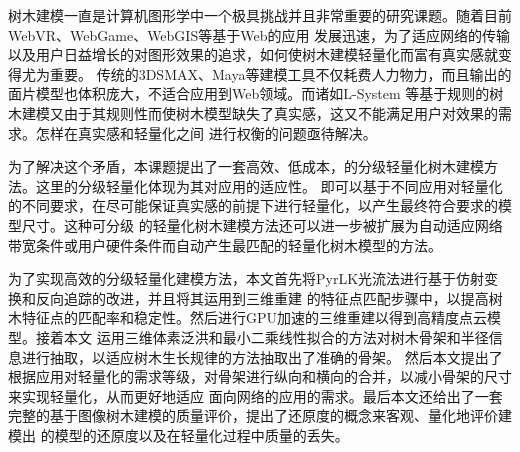 \begin{cabstract}
树木建模一直是计算机图形学中一个极具挑战并且非常重要的研究课题。随着目前WebVR、WebGame、WebGIS等基于Web的应用
发展迅速，为了适应网络的传输以及用户日益增长的对图形效果的追求，如何使树木建模轻量化而富有真实感就变得尤为重要。
传统的3DSMAX、Maya等建模工具不仅耗费人力物力，而且输出的面片模型也体积庞大，不适合应用到Web领域。而诸如L-System
等基于规则的树木建模又由于其规则性而使树木模型缺失了真实感，这又不能满足用户对效果的需求。怎样在真实感和轻量化之间
进行权衡的问题亟待解决。

为了解决这个矛盾，本课题提出了一套高效、低成本，的分级轻量化树木建模方法。这里的分级轻量化体现为其对应用的适应性。
即可以基于不同应用对轻量化的不同要求，在尽可能保证真实感的前提下进行轻量化，以产生最终符合要求的模型尺寸。这种可分级
的轻量化树木建模方法还可以进一步被扩展为自动适应网络带宽条件或用户硬件条件而自动产生最匹配的轻量化树木模型的方法。

为了实现高效的分级轻量化建模方法，本文首先将PyrLK光流法进行基于仿射变换和反向追踪的改进，并且将其运用到三维重建
的特征点匹配步骤中，以提高树木特征点的匹配率和稳定性。然后进行GPU加速的三维重建以得到高精度点云模型。接着本文
运用三维体素泛洪和最小二乘线性拟合的方法对树木骨架和半径信息进行抽取，以适应树木生长规律的方法抽取出了准确的骨架。
然后本文提出了根据应用对轻量化的需求等级，对骨架进行纵向和横向的合并，以减小骨架的尺寸来实现轻量化，从而更好地适应
面向网络的应用的需求。最后本文还给出了一套完整的基于图像树木建模的质量评价，提出了还原度的概念来客观、量化地评价建模出
的模型的还原度以及在轻量化过程中质量的丢失。
\end{cabstract}


